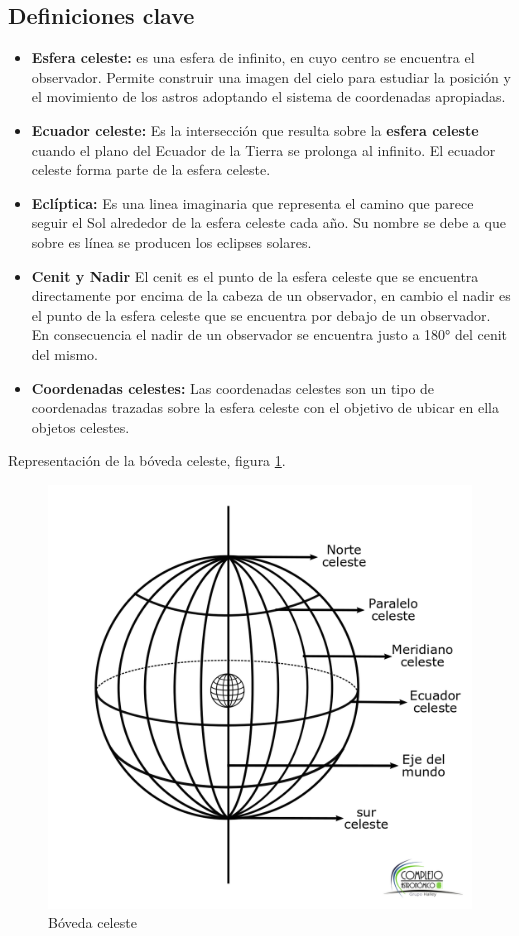 \documentclass[10pt,a4paper]{article}
\begin{document}
\subsection{Definiciones clave}
\begin{itemize}
\item \textbf{Esfera celeste:} es una esfera de infinito, en cuyo centro se encuentra el observador. Permite construir una imagen  del cielo para estudiar la posición y el movimiento de los astros adoptando el sistema de coordenadas apropiadas.
\item \textbf{Ecuador celeste:} Es la intersección que resulta sobre la \textbf{esfera celeste} cuando el plano del Ecuador de la Tierra se prolonga al infinito. El ecuador celeste forma parte de la esfera celeste.
\item \textbf{Eclíptica:} Es una linea imaginaria que representa el camino que parece seguir el Sol alrededor de la esfera celeste cada año. Su nombre se debe a que sobre es línea se producen los eclipses solares.
\item \textbf{Cenit y Nadir} El cenit es el punto de la esfera celeste que se encuentra directamente por encima de la cabeza de un observador, en cambio el nadir es el punto de la esfera celeste que se encuentra por debajo de un observador. En consecuencia el nadir de un observador se encuentra justo a 180° del cenit del mismo.
\item \textbf{Coordenadas celestes:} Las coordenadas celestes son un tipo de coordenadas trazadas sobre la esfera celeste con el objetivo de ubicar en ella objetos celestes.
\end{itemize}

Representación de la bóveda celeste, figura \ref{b_celeste}.
\begin{figure}[!h]
\centering
\includegraphics[scale=0.3]{Imagenes/boveda_celeste.png} 
\caption{Bóveda celeste}
\label{b_celeste}
\end{figure}
\end{document}
